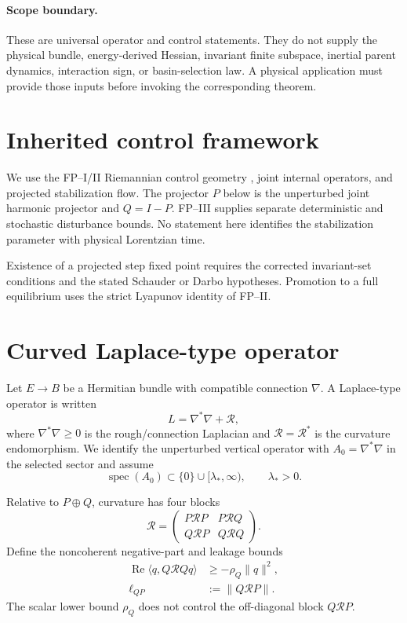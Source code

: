 \documentclass[11pt]{article}
\begin{document}
\paragraph{Scope boundary.}
These are universal operator and control statements.  They do not supply the
physical bundle, energy-derived Hessian, invariant finite subspace, inertial
parent dynamics, interaction sign, or basin-selection law.  A physical
application must provide those inputs before invoking the corresponding
theorem.

\tableofcontents

\section{Inherited control framework}

We use the FP--I/II Riemannian control geometry \cite{FPI,FPII}, joint internal
operators, and projected stabilization flow. The projector $P$ below is the
unperturbed joint harmonic projector and $Q=I-P$. FP--III \cite{FPIII} supplies separate
deterministic and stochastic disturbance bounds. No statement here identifies
the stabilization parameter with physical Lorentzian time.

Existence of a projected step fixed point requires the corrected invariant-set
conditions and the stated Schauder or Darbo hypotheses. Promotion to a full
equilibrium uses the strict Lyapunov identity of FP--II.

\section{Curved Laplace-type operator}

Let $E\to B$ be a Hermitian bundle with compatible connection $\nabla$. A
Laplace-type operator is written
\begin{equation}
L=\nabla^\ast\nabla+\mathcal R,
\label{eq:weitzenbock}
\end{equation}
where $\nabla^\ast\nabla\ge0$ is the rough/connection Laplacian and
$\mathcal R=\mathcal R^\ast$ is the curvature endomorphism. We identify the
unperturbed vertical operator with $A_0=\nabla^\ast\nabla$ in the selected
sector and assume
\[
\operatorname{spec}(A_0)\subset\{0\}\cup[\lambda_\ast,\infty),
\qquad \lambda_\ast>0.
\]

Relative to $P\oplus Q$, curvature has four blocks
\[
\mathcal R=
\begin{pmatrix}
P\mathcal RP&P\mathcal RQ\\
Q\mathcal RP&Q\mathcal RQ
\end{pmatrix}.
\]
Define the noncoherent negative-part and leakage bounds
\begin{align}
\operatorname{Re}\langle q,Q\mathcal RQq\rangle
&\ge-\rho_Q\|q\|^2,\\
\ell_{QP}&:=\|Q\mathcal RP\|.
\end{align}
The scalar lower bound $\rho_Q$ does not control the off-diagonal block
$Q\mathcal RP$.
\end{document}
